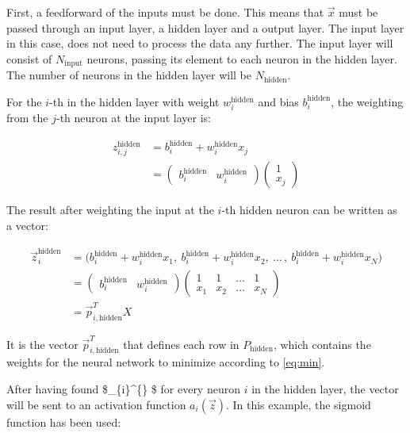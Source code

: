 \documentclass[11pt]{article}
\begin{document}
First, a feedforward of the inputs must be done. This means that
\(\vec x\) must be passed through an input layer, a hidden layer and a
output layer. The input layer in this case, does not need to process the
data any further. The input layer will consist of \(N_{\text{input} }\)
neurons, passing its element to each neuron in the hidden layer. The
number of neurons in the hidden layer will be \(N_{\text{hidden} }\).

For the \(i\)-th in the hidden layer with weight
\(w_i^{\text{hidden} }\) and bias \(b_i^{\text{hidden} }\), the
weighting from the \(j\)-th neuron at the input layer is:

\[ 
\begin{aligned}
z_{i,j}^{\text{hidden}} &= b_i^{\text{hidden}} + w_i^{\text{hidden}}x_j \\
&= 
\begin{pmatrix}
b_i^{\text{hidden}} & w_i^{\text{hidden}}
\end{pmatrix}
\begin{pmatrix}
1 \\
x_j
\end{pmatrix} 
\end{aligned}
\]

The result after weighting the input at the \(i\)-th hidden neuron can
be written as a vector:

\[
\begin{aligned}
\vec{z}_{i}^{\text{hidden}} &= \Big( b_i^{\text{hidden}} + w_i^{\text{hidden}}x_1 , \ b_i^{\text{hidden}} + w_i^{\text{hidden}} x_2, \ \dots \, , \ b_i^{\text{hidden}} + w_i^{\text{hidden}} x_N\Big)  \\
&= 
\begin{pmatrix}
 b_i^{\text{hidden}}  & w_i^{\text{hidden}}
\end{pmatrix}
\begin{pmatrix}
1  & 1 & \dots & 1 \\
x_1 & x_2 & \dots & x_N
\end{pmatrix} \\
&= \vec{p}_{i, \text{hidden}}^T X
\end{aligned}
\]

It is the vector \(\vec{p}_{i, \text{hidden}}^T\) that defines each row
in \(P_{\text{hidden} }\), which contains the weights for the neural
network to minimize according to \eqref{eq:min}.

After having found \$\_\{i\}\^{}\{\} \$ for every
neuron \(i\) in the hidden layer, the vector will be sent to an
activation function \(a_i(\vec{z})\). In this example, the sigmoid
function has been used:
\end{document}
